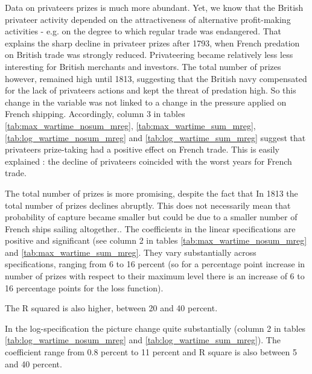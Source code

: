 \documentclass[12pt,a4paper,notitlepage,english]{article}
\begin{document}
Data on privateers prizes is much more abundant.
Yet, we know that the British privateer activity depended on the attractiveness of alternative profit-making activities \citep[p. 673]{Villiers1991,Hillmann2011} - e.g. on the degree to which regular trade was endangered. That explains the sharp decline in privateer prizes after 1793, when French predation on British trade was strongly reduced.
Privateering became relatively less less interesting for British merchants and investors.
The total number of prizes however, remained high until 1813, suggesting that the British navy compensated for the lack of privateers actions and kept the threat of predation high.
So this change in the variable was not linked to a change in the pressure applied on French shipping.
Accordingly, column 3 in tables  \ref{tab:max_wartime_nosum_mreg},  \ref{tab:max_wartime_sum_mreg}, \ref{tab:log_wartime_nosum_mreg} and   \ref{tab:log_wartime_sum_mreg}  suggest that privateers prize-taking had a positive effect on French trade.
This is easily explained : the decline of privateers coincided with the worst years for French trade.




The total number of prizes is more promising, despite the fact that In 1813 the total number of prizes declines abruptly.
This does not necessarily mean that probability of capture became smaller but could be due to a smaller number of French ships sailing altogether..
The coefficients in the linear specifications are positive and significant (see column 2 in tables  \ref{tab:max_wartime_nosum_mreg} and  \ref{tab:max_wartime_sum_mreg}.
They vary substantially across specifications, ranging from 6 to 16 percent (so for a percentage point increase in number of prizes with respect to their maximum level there is an increase of 6 to 16 percentage points for the loss function).

The R squared is also higher, between 20 and 40 percent.

In the log-specification the picture change quite substantially (column 2 in tables \ref{tab:log_wartime_nosum_mreg} and \ref{tab:log_wartime_sum_mreg}).
The coefficient range from 0.8 percent to 11 percent and R square is also between 5 and 40 percent.
\end{document}
